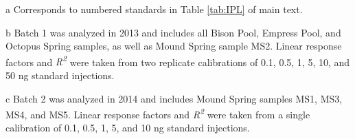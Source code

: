 {\begin{table}
\begin{threeparttable}
\begin{tablenotes}
\small
\item [a] Corresponds to numbered standards in Table \ref{tab:IPL} of main text.
\item [b] Batch 1 was analyzed in 2013 and includes all Bison Pool, Empress Pool, and Octopus Spring samples, as well as Mound Spring sample MS2. Linear response factors and \textit{R\textsuperscript{2}} were taken from two replicate calibrations of 0.1, 0.5, 1, 5, 10, and 50 ng standard injections.
\item [c] Batch 2 was analyzed in 2014 and includes Mound Spring samples MS1, MS3, MS4, and MS5. Linear response factors and \textit{R\textsuperscript{2}} were taken from a single calibration of 0.1, 0.5, 1, 5, and 10 ng standard injections.

\end{tablenotes}

  \label{tab:RF}
  \end{threeparttable}
\end{table}

\doublespace
\clearpage
}


